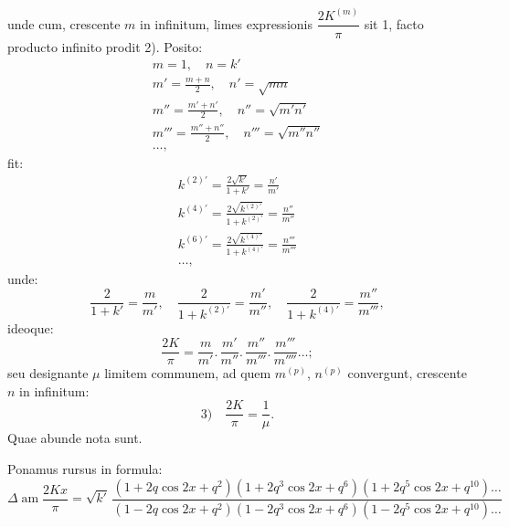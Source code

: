 \documentclass{article}
\begin{document}
unde cum, crescente $m$ in infinitum, limes expressionis $\dfrac{2K^{(m)}}{\pi}$ sit 1, facto producto infinito prodit 2). Posito:
\[
\begin{gathered}
m=1,\quad n=k'
\\[2ex]
m'=\frac{m+n}{2},\quad n'=\sqrt{mn}
\\[2ex]
m''=\frac{m'+n'}{2},\quad n''=\sqrt{m'n'}
\\[2ex]
m'''=\frac{m''+n''}{2},\quad n'''=\sqrt{m''n''}
\\[2ex]
\ldots,
\end{gathered}
\]
fit:
\[
\begin{gathered}
k^{(2)\prime}=\frac{2\sqrt{k'}}{1+k'}=\frac{n'}{m'}
\\[2ex]
k^{(4)\prime}=\frac{2\sqrt{k^{(2)\prime}}}{1+k^{(2)\prime}}=\frac{n''}{m''}
\\[2ex]
k^{(6)\prime}=\frac{2\sqrt{k^{(4)\prime}}}{1+k^{(4)\prime}}=\frac{n'''}{m'''}
\\[2ex]
\ldots,
\end{gathered}
\]
unde:
\[
\frac{2}{1+k'}=\frac{m}{m'},\quad\frac{2}{1+k^{(2)\prime}}=\frac{m'}{m''},\quad\frac{2}{1+k^{(4)\prime}}=\frac{m''}{m'''},
\]
ideoque:
\[
\frac{2K}{\pi}=\frac{m}{m'}.\,\frac{m'}{m''}.\,\frac{m''}{m'''}.\,\frac{m'''}{m''''}\ldots;
\]
seu designante $\mu$ limitem communem, ad quem $m^{(p)}$, $n^{(p)}$ convergunt, crescente $n$ in infinitum:
\[
\text{3)}\quad\frac{2K}{\pi}=\frac{1}{\mu}.
\]
Quae abunde nota sunt.

Ponamus rursus in formula:
\[
\Delta\operatorname{am}\frac{2Kx}{\pi}=\sqrt{k'}\,\frac{(1+2q\cos 2x+q^{2})(1+2q^{3}\cos 2x+q^{6})(1+2q^{5}\cos 2x+q^{10})\ldots}{(1-2q\cos 2x+q^{2})(1-2q^{3}\cos 2x+q^{6})(1-2q^{5}\cos 2x+q^{10})\ldots}
\]
\end{document}
